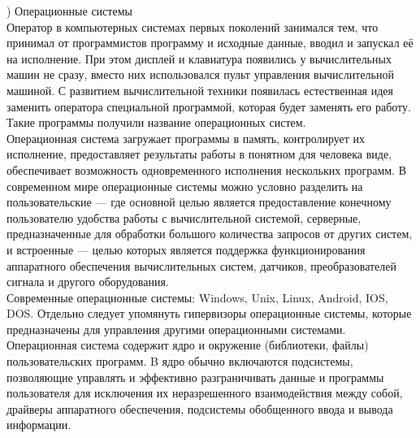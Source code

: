 

) Операционные системы \\
\noindent Оператор в компьютерных системах первых поколений занимался тем, что принимал от программистов программу и исходные данные, вводил и запускал её на исполнение. При этом дисплей и клавиатура появились у вычислительных машин не сразу, вместо них использовался пульт управления вычислительной машиной. С развитием вычислительной техники появилась естественная идея заменить оператора специальной программой, которая будет заменять его работу. Такие программы получили название операционных систем. \\
Операционная система загружает программы в память, контролирует их исполнение, предоставляет результаты работы в понятном для человека виде, обеспечивает возможность одновременного исполнения нескольких программ. В современном мире операционные системы можно условно разделить на пользовательские — где основной целью является предоставление конечному пользователю удобства работы с вычислительной системой, серверные, предназначенные для обработки большого количества запросов от других систем, и встроенные — целью которых является поддержка функционирования аппаратного обеспечения вычислительных систем, датчиков, преобразователей сигнала и другого оборудования. \\
Современные операционные системы: Windows, Unix, Linux, Android, IOS, DOS. Отдельно следует упомянуть гипервизоры операционные системы, которые предназначены для управления другими операционными системами. \\
Операционная система содержит ядро и окружение (библиотеки, файлы) пользовательских программ. B ядро обычно включаются подсистемы, позволяющие управлять и эффективно разграничивать данные и программы пользователя для исключения их неразрешенного взаимодействия между собой, драйверы аппаратного обеспечения, подсистемы обобщенного ввода и вывода информации. \\

